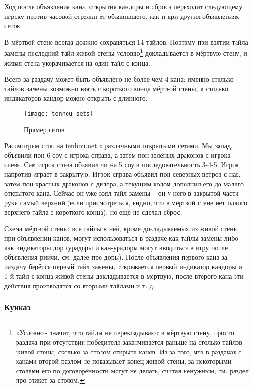 
Ход после объявления кана, открытия кандоры и сброса переходит следующему игроку против часовой стрелки от объявившего, как и при других объявлениях сетов. 

В мёртвой стене всегда должно сохраняться 14 тайлов. Поэтому при взятии тайла замены последний тайл живой стены условно\footnote{«Условно» значит, что тайлы не перекладывают в мёртвую стену, просто раздача при отсутствии победителя заканчивается раньше на столько тайлов живой стены, сколько за столом открыто канов. Из-за того, что в раздачах с канами второй разлом не показывает конец живой стены, за некоторыми столами его по договорённости могут не делать, считая ненужным, см. раздел про этикет за столом.} докладывается в мёртвую стену, и живая стена укорачивается на один тайл с конца.

Всего за раздачу может быть объявлено не более чем 4 кана: именно столько тайлов замены возможно взять с короткого конца мёртвой стены, и столько индикаторов кандор можно открыть с длинного.

\begin{figure}[H]
	\centering
	\texttt{[image: tenhou-sets]}
	\caption{Пример сетов}
\end{figure}

Рассмотрим стол на tenhou.net c различными открытыми сетами. Мы запад, объявили пон 6 соу с игрока справа, а затем пон зелёных драконов с игрока слева. Сам игрок слева объявил чи на 5 соу в последовательность 3-4-5. Игрок напротив играет в закрытую. Игрок справа объявил пон северных ветров с нас, затем пон красных драконов с дилера, а текущим ходом дополнил его до малого открытого кана. Сейчас он уже взял тайл замены – он у него в закрытой части руки самый верхний (если присмотреться, видно, что в мёртвой стене нет одного верхнего тайла с короткого конца), но ещё не сделал сброс.

Схема мёртвой стены: все тайлы в ней, кроме докладываемых из живой стены при объявлении канов, могут использоваться в раздаче как тайлы замены либо как индикаторы дор (урадоры и кан-урадоры могут вводиться в игру после объявления риичи, см. далее про доры). После объявления первого кана за раздачу берётся первый тайл замены, открывается первый индикатор кандоры и 1-й тайл с конца живой стены докладывается в мёртвую, после второго кана эти действия производятся со вторыми тайлами и т. д. 

\subsubsection{Куикаэ}

